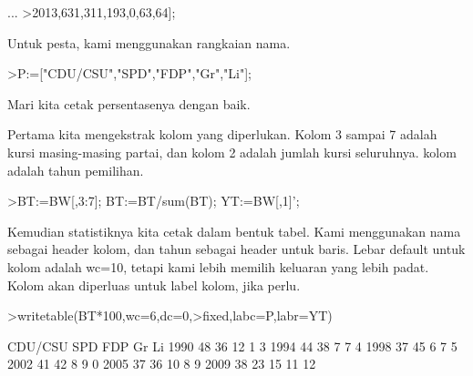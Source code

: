 \documentclass[a4paper,10pt]{article}
\begin{document}
\begin{eulernotebook}
\begin{eulercomment}
\begin{eulercomment}
\begin{eulercomment}
\begin{eulercomment}
\begin{eulercomment}
\begin{eulercomment}
\begin{eulercomment}
\begin{eulercomment}
\begin{eulercomment}
\begin{eulercomment}
\begin{eulercomment}
\begin{eulercomment}
\begin{eulercomment}
\begin{eulercomment}
\begin{eulercomment}
\begin{eulercomment}
\begin{eulercomment}
\begin{eulercomment}
\begin{eulercomment}
\begin{eulercomment}
\begin{eulercomment}
\begin{eulercomment}
\begin{eulercomment}
\begin{eulercomment}
\begin{eulercomment}
\begin{eulercomment}
\begin{eulercomment}
\begin{eulercomment}
\begin{eulercomment}
\begin{eulercomment}
\begin{eulercomment}
\begin{eulercomment}
\begin{eulercomment}
\begin{eulercomment}
\begin{eulercomment}
\begin{eulercomment}
\begin{eulercomment}
\begin{eulercomment}
\begin{eulercomment}
\begin{eulercomment}
\begin{eulercomment}
\begin{eulercomment}
\begin{eulercomment}
\begin{eulercomment}
\begin{eulercomment}
\begin{eulercomment}
\begin{eulercomment}
\begin{eulercomment}
\begin{eulercomment}
\begin{eulercomment}
\begin{eulercomment}
\begin{eulercomment}
\begin{eulercomment}
\begin{eulercomment}
\begin{eulercomment}
\begin{eulercomment}
\begin{eulercomment}
\begin{eulercomment}
\begin{eulercomment}
\begin{eulercomment}
\begin{eulercomment}
\begin{eulercomment}
\begin{eulercomment}
\begin{eulercomment}
\begin{eulercomment}
\begin{eulercomment}
\begin{eulerprompt}
...
>2013,631,311,193,0,63,64];
\end{eulerprompt}
\begin{eulercomment}
Untuk pesta, kami menggunakan rangkaian nama.
\end{eulercomment}
\begin{eulerprompt}
>P:=["CDU/CSU","SPD","FDP","Gr","Li"];
\end{eulerprompt}
\begin{eulercomment}
Mari kita cetak persentasenya dengan baik.

Pertama kita mengekstrak kolom yang diperlukan. Kolom 3 sampai 7
adalah kursi masing-masing partai, dan kolom 2 adalah jumlah kursi
seluruhnya. kolom adalah tahun pemilihan.
\end{eulercomment}
\begin{eulerprompt}
>BT:=BW[,3:7]; BT:=BT/sum(BT); YT:=BW[,1]';
\end{eulerprompt}
\begin{eulercomment}
Kemudian statistiknya kita cetak dalam bentuk tabel. Kami menggunakan
nama sebagai header kolom, dan tahun sebagai header untuk baris. Lebar
default untuk kolom adalah wc=10, tetapi kami lebih memilih keluaran
yang lebih padat. Kolom akan diperluas untuk label kolom, jika perlu.
\end{eulercomment}
\begin{eulerprompt}
>writetable(BT*100,wc=6,dc=0,>fixed,labc=P,labr=YT)
\end{eulerprompt}
\begin{euleroutput}
         CDU/CSU   SPD   FDP    Gr    Li
    1990      48    36    12     1     3
    1994      44    38     7     7     4
    1998      37    45     6     7     5
    2002      41    42     8     9     0
    2005      37    36    10     8     9
    2009      38    23    15    11    12
    
\end{euleroutput}
\end{eulercomment}
\end{eulercomment}
\end{eulercomment}
\end{eulercomment}
\end{eulercomment}
\end{eulercomment}
\end{eulercomment}
\end{eulercomment}
\end{eulercomment}
\end{eulercomment}
\end{eulercomment}
\end{eulercomment}
\end{eulercomment}
\end{eulercomment}
\end{eulercomment}
\end{eulercomment}
\end{eulercomment}
\end{eulercomment}
\end{eulercomment}
\end{eulercomment}
\end{eulercomment}
\end{eulercomment}
\end{eulercomment}
\end{eulercomment}
\end{eulercomment}
\end{eulercomment}
\end{eulercomment}
\end{eulercomment}
\end{eulercomment}
\end{eulercomment}
\end{eulercomment}
\end{eulercomment}
\end{eulercomment}
\end{eulercomment}
\end{eulercomment}
\end{eulercomment}
\end{eulercomment}
\end{eulercomment}
\end{eulercomment}
\end{eulercomment}
\end{eulercomment}
\end{eulercomment}
\end{eulercomment}
\end{eulercomment}
\end{eulercomment}
\end{eulercomment}
\end{eulercomment}
\end{eulercomment}
\end{eulercomment}
\end{eulercomment}
\end{eulercomment}
\end{eulercomment}
\end{eulercomment}
\end{eulercomment}
\end{eulercomment}
\end{eulercomment}
\end{eulercomment}
\end{eulercomment}
\end{eulercomment}
\end{eulercomment}
\end{eulercomment}
\end{eulercomment}
\end{eulercomment}
\end{eulercomment}
\end{eulercomment}
\end{eulercomment}
\end{eulernotebook}
\end{document}
